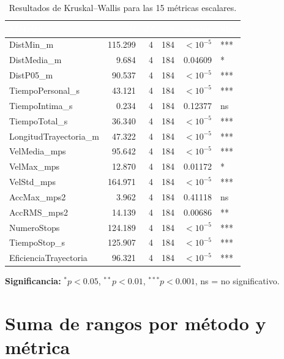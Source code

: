 \documentclass[12pt,a4paper,oneside]{book}
\begin{document}
\begin{table}[H]
\centering
\caption{Resultados de Kruskal--Wallis para las 15 métricas escalares.}
\renewcommand{\arraystretch}{1.3}
\small
\begin{tabular}{lrrrrl}
\toprule
\rowcolor{primary}
\textcolor{white}{\textbf{Métrica}} &
\textcolor{white}{\textbf{$H$}} &
\textcolor{white}{\textbf{$df$}} &
\textcolor{white}{\textbf{$N$}} &
\textcolor{white}{\textbf{$p$-valor}} &
\textcolor{white}{\textbf{Sig.}} \\
\midrule
DistMin\_m & 115.299 & 4 & 184 & $<10^{-5}$ & *** \\
DistMedia\_m & 9.684 & 4 & 184 & 0.04609 & * \\
DistP05\_m & 90.537 & 4 & 184 & $<10^{-5}$ & *** \\
TiempoPersonal\_s & 43.121 & 4 & 184 & $<10^{-5}$ & *** \\
TiempoIntima\_s & 0.234 & 4 & 184 & 0.12377 & ns \\
TiempoTotal\_s & 36.340 & 4 & 184 & $<10^{-5}$ & *** \\
LongitudTrayectoria\_m & 47.322 & 4 & 184 & $<10^{-5}$ & *** \\
VelMedia\_mps & 95.642 & 4 & 184 & $<10^{-5}$ & *** \\
VelMax\_mps & 12.870 & 4 & 184 & 0.01172 & * \\
VelStd\_mps & 164.971 & 4 & 184 & $<10^{-5}$ & *** \\
AccMax\_mps2 & 3.962 & 4 & 184 & 0.41118 & ns \\
AccRMS\_mps2 & 14.139 & 4 & 184 & 0.00686 & ** \\
NumeroStops & 124.189 & 4 & 184 & $<10^{-5}$ & *** \\
TiempoStop\_s & 125.907 & 4 & 184 & $<10^{-5}$ & *** \\
EficienciaTrayectoria & 96.321 & 4 & 184 & $<10^{-5}$ & *** \\
\bottomrule
\end{tabular}
\end{table}

\textbf{Significancia:} $^{*}p<0.05$, $^{**}p<0.01$, $^{***}p<0.001$, ns = no significativo.

\section{Suma de rangos por método y métrica}
\end{document}
